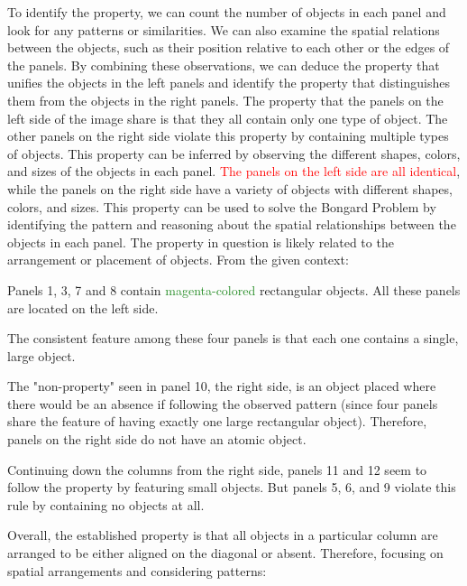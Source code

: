 \begin{tcolorbox}[breakable,enhanced jigsaw,opacityback=0,]
\begin{dialogue}
		To identify the property, we can count the number of objects in each panel and look for any patterns or similarities. We can also examine the spatial relations between the objects, such as their position relative to each other or the edges of the panels. By combining these observations, we can deduce the property that unifies the objects in the left panels and identify the property that distinguishes them from the objects in the right panels.
		\vspace{1em}
		 The property that the panels on the left side of the image share is that they all contain only one type of object. The other panels on the right side violate this property by containing multiple types of objects. This property can be inferred by observing the different shapes, colors, and sizes of the objects in each panel. \textcolor{red}{The panels on the left side are all identical}, while the panels on the right side have a variety of objects with different shapes, colors, and sizes. This property can be used to solve the Bongard Problem by identifying the pattern and reasoning about the spatial relationships between the objects in each panel.
		\vspace{1em}
		 The property in question is likely related to the arrangement or placement of objects. From the given context:
		
		Panels 1, 3, 7 and 8 contain \textcolor{ForestGreen}{magenta-colored} rectangular objects.
		All these panels are located on the left side.
		
		The consistent feature among these four panels is that each one contains a single, large object.
		
		The "non-property" seen in panel 10, the right side, is an object placed where there would be an absence if following the observed pattern (since four panels share the feature of having exactly one large rectangular object). Therefore, panels on the right side do not have an atomic object.
		
		Continuing down the columns from the right side, panels 11 and 12 seem to follow the property by featuring small objects. But panels 5, 6, and 9 violate this rule by containing no objects at all.
		
		Overall, the established property is that all objects in a particular column are arranged to be either aligned on the diagonal or absent. Therefore, focusing on spatial arrangements and considering patterns:
		

\end{dialogue}
\end{tcolorbox}
